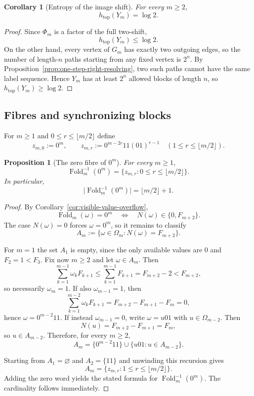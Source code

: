 \documentclass[11pt,letterpaper]{article}
\numberwithin{equation}{section}
\theoremstyle{plain}
\newtheorem{proposition}[theorem]{Proposition}
\newtheorem{corollary}[theorem]{Corollary}
\theoremstyle{definition}
\theoremstyle{remark}
\DeclareMathOperator{\Fold}{Fold}
\begin{document}
\begin{corollary}[Entropy of the image shift]
\label{cor:Phi-m-entropy}
For every $m\ge 2$,
\[
h_{\mathrm{top}}(Y_m)=\log 2.
\]
\end{corollary}

\begin{proof}
Since $\Phi_m$ is a factor of the full two-shift,
\[
h_{\mathrm{top}}(Y_m)\le \log 2.
\]
On the other hand, every vertex of $G_m$ has exactly two outgoing edges, so the
number of length-$n$ paths starting from any fixed vertex is $2^n$.  By
Proposition~\ref{prop:one-step-right-resolving}, two such paths cannot have the
same label sequence.  Hence $Y_m$ has at least $2^n$ allowed blocks of length
$n$, so $h_{\mathrm{top}}(Y_m)\ge \log 2$.
\end{proof}

\subsection{Fibres and synchronizing blocks}

For $m\ge 1$ and $0\le r\le \lfloor m/2\rfloor$ define
\[
z_{m,0}:=0^m,
\qquad
z_{m,r}:=0^{m-2r}11(01)^{r-1}
\quad (1\le r\le \lfloor m/2\rfloor).
\]

\begin{proposition}[The zero fibre of $0^m$]
\label{prop:zero-fiber-explicit}
For every $m\ge 1$,
\[
\Fold_m^{-1}(0^m)=\{z_{m,r}:0\le r\le \lfloor m/2\rfloor\}.
\]
In particular,
\[
\bigl|\Fold_m^{-1}(0^m)\bigr|=\lfloor m/2\rfloor+1.
\]
\end{proposition}

\begin{proof}
By Corollary~\ref{cor:visible-value-overflow},
\[
\Fold_m(\omega)=0^m
\quad\Longleftrightarrow\quad
N(\omega)\in\{0,F_{m+2}\}.
\]
The case $N(\omega)=0$ forces $\omega=0^m$, so it remains to classify
\[
A_m:=\{\omega\in\Omega_m:N(\omega)=F_{m+2}\}.
\]

For $m=1$ the set $A_1$ is empty, since the only available values are $0$ and
$F_2=1<F_3$.  Fix now $m\ge 2$ and let $\omega\in A_m$.  Then
\[
\sum_{k=1}^{m-1}\omega_kF_{k+1}\le \sum_{k=1}^{m-1}F_{k+1}=F_{m+2}-2<F_{m+2},
\]
so necessarily $\omega_m=1$.  If also $\omega_{m-1}=1$, then
\[
\sum_{k=1}^{m-2}\omega_kF_{k+1}
=
F_{m+2}-F_{m+1}-F_m
=
0,
\]
hence $\omega=0^{m-2}11$.  If instead $\omega_{m-1}=0$, write $\omega=u01$
with $u\in\Omega_{m-2}$.  Then
\[
N(u)=F_{m+2}-F_{m+1}=F_m,
\]
so $u\in A_{m-2}$.  Therefore, for every $m\ge 2$,
\[
A_m=\{0^{m-2}11\}\cup\{u01:u\in A_{m-2}\}.
\]

Starting from $A_1=\varnothing$ and $A_2=\{11\}$ and unwinding this recursion
gives
\[
A_m=\{z_{m,r}:1\le r\le \lfloor m/2\rfloor\}.
\]
Adding the zero word yields the stated formula for $\Fold_m^{-1}(0^m)$.  The
cardinality follows immediately.
\end{proof}
\end{document}
